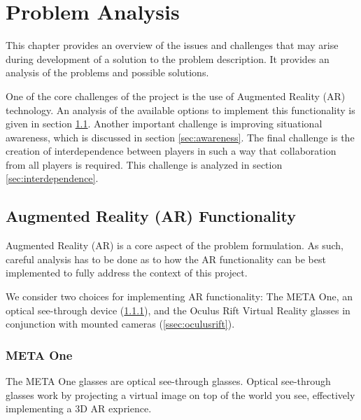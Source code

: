 \chapter{Problem Analysis} \label{cha:analysis}
	This chapter provides an overview of the issues and challenges that may
	arise during development of a solution to the problem description. It
	provides an analysis of the problems and possible solutions.

	One of the core challenges of the project is the use of Augmented Reality
	(AR) technology. An analysis of the available options to implement this
	functionality is given in section \ref{sec:ar}. Another important challenge
	is improving situational awareness, which is discussed in section
	\ref{sec:awareness}. The final challenge is the creation of interdependence
	between players in such a way that collaboration from all players is
	required. This challenge is analyzed in section \ref{sec:interdependence}.

	\section{Augmented Reality (AR) Functionality} \label{sec:ar}
		Augmented Reality (AR) is a core aspect of the problem formulation.
		As such, careful analysis has to be done as to how the AR functionality
		can be best implemented to fully address the context of this project.

		We consider two choices for implementing AR functionality: The META One,
		an optical see-through device (\ref{ssec:metaone}), and the Oculus Rift
		Virtual Reality glasses in conjunction with mounted cameras
		(\ref{ssec:oculusrift}).

		\subsection{META One} \label{ssec:metaone}

			The META One glasses are optical see-through glasses. \cite{metaone}
			Optical see-through glasses work by projecting a virtual image on
			top of the world you see, effectively implementing a 3D AR
			exprience.

